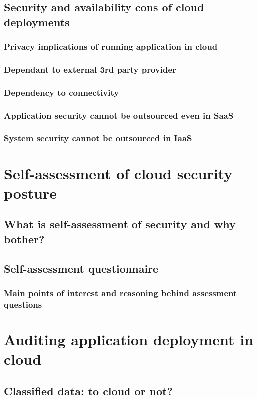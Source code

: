 \documentclass{article}
\begin{document}
\subsection{Security and availability cons of cloud deployments}
\blindtext[2]
\subsubsection{Privacy implications of running application in cloud}
\blindtext[2]
\subsubsection{Dependant to external 3rd party provider}
\blindtext[2]
\subsubsection{Dependency to connectivity}
\blindtext[2]
\subsubsection{Application security cannot be outsourced even in SaaS}
\blindtext[2]
\subsubsection{System security cannot be outsourced in IaaS}
\blindtext[2]
\section{Self-assessment of cloud security posture}
\blindtext[2]
\subsection{What is self-assessment of security and why bother?}
\blindtext[2]
\subsection{Self-assessment questionnaire}
\blindtext[2]
\subsubsection{Main points of interest and reasoning behind assessment questions}
\blindtext[2]
\section{Auditing application deployment in cloud}
\blindtext[2]
\subsection{Classified data: to cloud or not?}
\blindtext[2]
\end{document}
